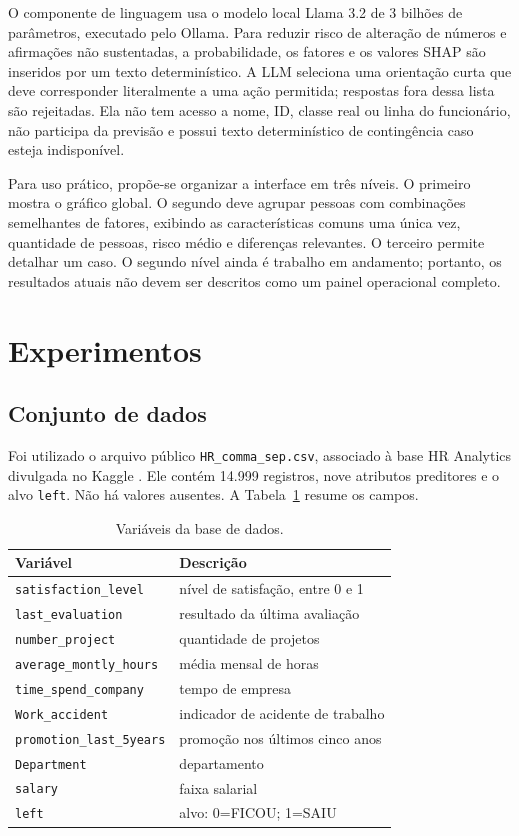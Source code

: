 \documentclass[12pt]{article}
\begin{document}
O componente de linguagem usa o modelo local Llama 3.2 de 3 bilhões de parâmetros, executado pelo Ollama. Para reduzir risco de alteração de números e afirmações não sustentadas, a probabilidade, os fatores e os valores SHAP são inseridos por um texto determinístico. A LLM seleciona uma orientação curta que deve corresponder literalmente a uma ação permitida; respostas fora dessa lista são rejeitadas. Ela não tem acesso a nome, ID, classe real ou linha do funcionário, não participa da previsão e possui texto determinístico de contingência caso esteja indisponível.

Para uso prático, propõe-se organizar a interface em três níveis. O primeiro mostra o gráfico global. O segundo deve agrupar pessoas com combinações semelhantes de fatores, exibindo as características comuns uma única vez, quantidade de pessoas, risco médio e diferenças relevantes. O terceiro permite detalhar um caso. O segundo nível ainda é trabalho em andamento; portanto, os resultados atuais não devem ser descritos como um painel operacional completo.

\section{Experimentos}
\label{sec:experimentos}

\subsection{Conjunto de dados}

Foi utilizado o arquivo público \texttt{HR\_comma\_sep.csv}, associado à base HR Analytics divulgada no Kaggle \cite{kaggleHR}. Ele contém 14.999 registros, nove atributos preditores e o alvo \texttt{left}. Não há valores ausentes. A Tabela~\ref{tab:variaveis} resume os campos.

\begin{table}[ht]
\centering
\caption{Variáveis da base de dados.}
\label{tab:variaveis}
\small
\begin{tabular}{ll}
\toprule
Variável & Descrição \\
\midrule
\texttt{satisfaction\_level} & nível de satisfação, entre 0 e 1 \\
\texttt{last\_evaluation} & resultado da última avaliação \\
\texttt{number\_project} & quantidade de projetos \\
\texttt{average\_montly\_hours} & média mensal de horas \\
\texttt{time\_spend\_company} & tempo de empresa \\
\texttt{Work\_accident} & indicador de acidente de trabalho \\
\texttt{promotion\_last\_5years} & promoção nos últimos cinco anos \\
\texttt{Department} & departamento \\
\texttt{salary} & faixa salarial \\
\texttt{left} & alvo: 0=FICOU; 1=SAIU \\
\bottomrule
\end{tabular}
\end{table}
\end{document}
